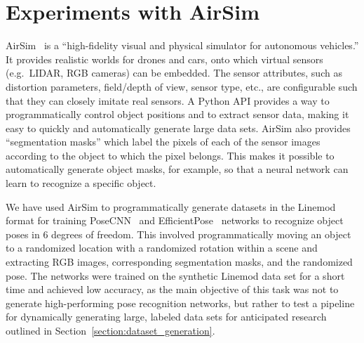 \section{Experiments with AirSim}

AirSim~\cite{airsim2017fsr} is a ``high-fidelity visual and physical simulator for autonomous vehicles.''
It provides realistic worlds for drones and cars, onto which virtual sensors (e.g.~LIDAR, RGB cameras) can be embedded.
The sensor attributes, such as distortion parameters, field/depth of view, sensor type, etc.,
are configurable such that they can closely imitate real sensors.
A Python API provides a way to programmatically control object positions and to extract sensor data,
making it easy to quickly and automatically generate large data sets.
AirSim also provides ``segmentation masks'' which label the pixels of each of the sensor images according to the
object to which the pixel belongs.
This makes it possible to automatically generate object masks, for example, so that a neural network can learn
to recognize a specific object.

We have used AirSim to programmatically generate datasets in the Linemod format for training PoseCNN~\cite{posecnn}
and EfficientPose~\cite{efficientpose} networks to recognize object poses in 6 degrees of freedom.
This involved programmatically moving an object to a randomized location with a randomized rotation within a scene
and extracting RGB images, corresponding segmentation masks, and the randomized pose.
The networks were trained on the synthetic Linemod data set for a short time and achieved low accuracy,
as the main objective of this task was not to generate high-performing pose recognition networks,
but rather to test a pipeline for dynamically generating large, labeled data sets for anticipated
research outlined in Section~\ref{section:dataset_generation}.